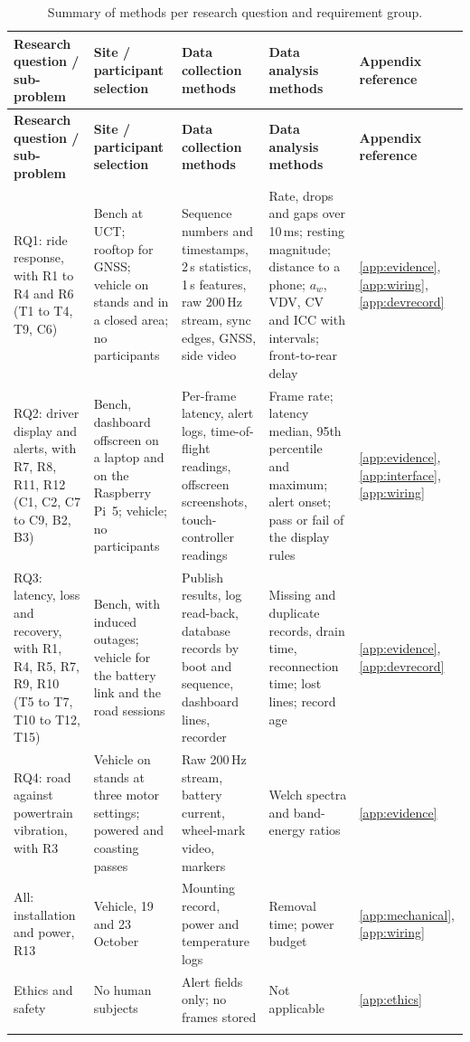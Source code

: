 {\footnotesize
\begin{longtable}{|>{\raggedright\arraybackslash}p{2.4cm}|>{\raggedright\arraybackslash}p{2.5cm}|>{\raggedright\arraybackslash}p{3.4cm}|>{\raggedright\arraybackslash}p{3.3cm}|>{\raggedright\arraybackslash}p{1.9cm}|}
\caption[Summary of methods per research question and requirement group]{Summary of methods per research question and requirement group.}
\label{tab:methods}\\
\hline
\textbf{Research question / sub-problem} & \textbf{Site / participant selection} & \textbf{Data collection methods} & \textbf{Data analysis methods} & \textbf{Appendix reference} \\ \hline
\endfirsthead
\hline
\textbf{Research question / sub-problem} & \textbf{Site / participant selection} & \textbf{Data collection methods} & \textbf{Data analysis methods} & \textbf{Appendix reference} \\ \hline
\endhead
RQ1: ride response, with R1 to R4 and R6 (T1 to T4, T9, C6) & Bench at UCT; rooftop for GNSS; vehicle on stands and in a closed area; no participants & Sequence numbers and timestamps, 2\,s statistics, 1\,s features, raw 200\,Hz stream, sync edges, GNSS, side video & Rate, drops and gaps over 10\,ms; resting magnitude; distance to a phone; $a_w$, VDV, CV and ICC with intervals; front-to-rear delay & \ref{app:evidence}, \ref{app:wiring}, \ref{app:devrecord} \\ \hline
RQ2: driver display and alerts, with R7, R8, R11, R12 (C1, C2, C7 to C9, B2, B3) & Bench, dashboard offscreen on a laptop and on the Raspberry Pi~5; vehicle; no participants & Per-frame latency, alert logs, time-of-flight readings, offscreen screenshots, touch-controller readings & Frame rate; latency median, 95th percentile and maximum; alert onset; pass or fail of the display rules & \ref{app:evidence}, \ref{app:interface}, \ref{app:wiring} \\ \hline
RQ3: latency, loss and recovery, with R1, R4, R5, R7, R9, R10 (T5 to T7, T10 to T12, T15) & Bench, with induced outages; vehicle for the battery link and the road sessions & Publish results, log read-back, database records by boot and sequence, dashboard lines, recorder & Missing and duplicate records, drain time, reconnection time; lost lines; record age & \ref{app:evidence}, \ref{app:devrecord} \\ \hline
RQ4: road against powertrain vibration, with R3 & Vehicle on stands at three motor settings; powered and coasting passes & Raw 200\,Hz stream, battery current, wheel-mark video, markers & Welch spectra and band-energy ratios & \ref{app:evidence} \\ \hline
All: installation and power, R13 & Vehicle, 19 and 23 October & Mounting record, power and temperature logs & Removal time; power budget & \ref{app:mechanical}, \ref{app:wiring} \\ \hline
Ethics and safety & No human subjects & Alert fields only; no frames stored & Not applicable & \ref{app:ethics} \\* \hline
\end{longtable}
}
